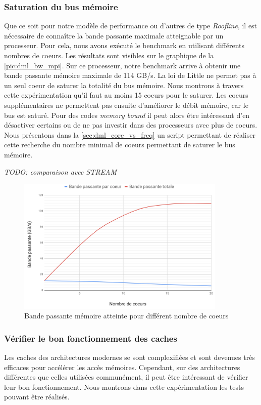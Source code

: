     \subsubsection{Saturation du bus mémoire}\label{sec:dml_saturation}
        Que ce soit pour notre modèle de performance ou d'autres de type \textit{Roofline}, il est nécessaire de connaître la bande passante maximale atteignable par un processeur. Pour cela, nous avons exécuté le benchmark en utilisant différents nombres de coeurs. Les résultats sont visibles sur le graphique de la \autoref{pic:dml_bw_mpi}. Sur ce processeur, notre benchmark arrive à obtenir une bande passante mémoire maximale de 114 GB/s. La loi de Little ne permet pas à un seul coeur de saturer la totalité du bus mémoire. Nous montrons à travers cette expérimentation qu'il faut au moins 15 coeurs pour le saturer. Les coeurs supplémentaires ne permettent pas ensuite d'améliorer le débit mémoire, car le bus est saturé. Pour des codes \textit{memory bound} il peut alors être intéressant d'en désactiver certains ou de ne pas investir dans des processeurs avec plus de coeurs. Nous présentons dans la \autoref{sec:dml_core_vs_freq} un script permettant de réaliser cette recherche du nombre minimal de coeurs permettant de saturer le bus mémoire. 
        
        \textit{TODO: comparaison avec STREAM}
        
        \begin{figure}
        \center
        \includegraphics[width=10cm]{images/dml_bw_mpi.png}
        \caption{\label{pic:dml_bw_mpi} Bande passante mémoire atteinte pour différent nombre de coeurs}
        \end{figure}
        
    
    
    

    \subsubsection{Vérifier le bon fonctionnement des caches} \label{sec:dml_cache_ok}
        Les caches des architectures modernes se sont complexifiées et sont devenues très efficaces pour accélérer les accès mémoires. Cependant, sur des architectures différentes que celles utilisées communément, il peut être intéressant de vérifier leur bon fonctionnement. Nous montrons dans cette expérimentation les tests pouvant être réalisés.
        
